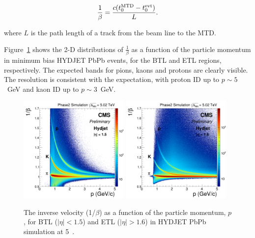 \begin{equation}
\frac{1}{\beta}=\frac{c(t_{0}^{\rm MTD}-t_{0}^{\rm evt})}{L}.
\end{equation}

\noindent where $L$ is the path length of a track from the beam line to the MTD.

Figure~\ref{fig:betavsp} shows the 2-D distributions of
$\frac{1}{\beta}$ as a function of the particle momentum in minimum
bias HYDJET PbPb events, for the BTL and ETL regions,
respectively. The expected bands for pions, kaons and protons are
clearly visible. The resolution is consistent with the expectation,
with proton ID up to $p \sim 5$~GeV and kaon ID up to $p \sim 3$~GeV.  

\begin{figure}[thb]
\centering
\includegraphics[width=0.48\textwidth]{fig/performance/cInvTOF_MC_Hydjet_PbPb_BTL_Inc.png}
\includegraphics[width=0.48\textwidth]{fig/performance/cInvTOF_MC_Hydjet_PbPb_ETL_Inc.png}
\vspace{-0.2cm}
  \caption{ \label{fig:betavsp} The inverse velocity (1/$\beta$) as a
    function of the particle momentum, $p$, for BTL ($|\eta|<1.5$) and ETL ($|\eta|>1.6$) in HYDJET PbPb simulation at 5~\TeV.}
\end{figure}

